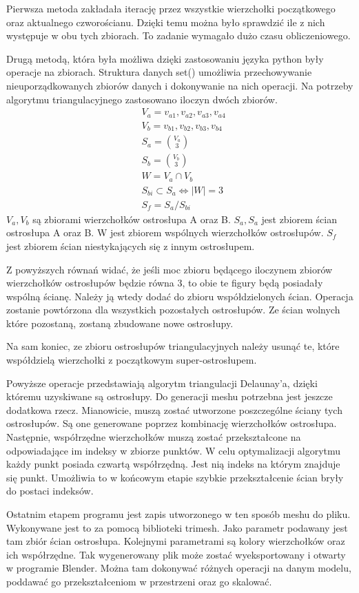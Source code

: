 Pierwsza metoda zakładała iterację przez wszystkie wierzchołki początkowego oraz aktualnego czworościanu. Dzięki temu można było sprawdzić ile z nich występuje w obu tych zbiorach. To zadanie wymagało dużo czasu obliczeniowego.

Drugą metodą, która była możliwa dzięki zastosowaniu języka python były operacje na zbiorach. Struktura danych set() umożliwia przechowywanie nieuporządkowanych zbiorów danych i dokonywanie na nich operacji. Na potrzeby algorytmu triangulacyjnego zastosowano iloczyn dwóch zbiorów.
\begin{equation}
    \begin{aligned}
    &V_{a}={v_{a1},v_{a2},v_{a3},v_{a4}}\\
    &V_{b}={v_{b1},v_{b2},v_{b3},v_{b4}}\\
    &S_{a}=\binom{V_{a}}{3}\\
    &S_{b}=\binom{V_{b}}{3}\\
    &W=V_{a} \cap V_{b}\\
    &S_{bi} 	\subset S_{a} \Leftrightarrow |W|=3\\
    &S_{f}=S_{a}/S_{bi}
    \end{aligned}
\end{equation}
$V_{a},V_{b}$ są zbiorami wierzchołków ostrosłupa A oraz B. $S_{a},S_{a}$ jest zbiorem ścian ostrosłupa A oraz B. W jest zbiorem wspólnych wierzchołków ostrosłupów. $S_{f}$ jest zbiorem ścian niestykających się z innym ostrosłupem.

Z powyższych równań widać, że jeśli moc zbioru będącego iloczynem zbiorów wierzchołków ostrosłupów będzie równa 3, to obie te figury będą posiadały wspólną ścianę. Należy ją wtedy dodać do zbioru współdzielonych ścian. Operacja zostanie powtórzona dla wszystkich pozostałych ostrosłupów. Ze ścian wolnych które pozostaną, zostaną zbudowane nowe ostrosłupy.

Na sam koniec, ze zbioru ostrosłupów triangulacyjnych należy usunąć te, które współdzielą wierzchołki z początkowym super-ostrosłupem.

Powyższe operacje przedstawiają algorytm triangulacji Delaunay'a, dzięki któremu uzyskiwane są ostrosłupy. Do generacji meshu potrzebna jest jeszcze dodatkowa rzecz. Mianowicie, muszą zostać utworzone poszczególne ściany tych ostrosłupów. Są one generowane poprzez kombinację wierzchołków ostrosłupa. Następnie, współrzędne wierzchołków muszą zostać przekształcone na odpowiadające im indeksy w zbiorze punktów. W celu optymalizacji algorytmu każdy punkt posiada czwartą współrzędną. Jest nią indeks na którym znajduje się punkt. Umożliwia to w końcowym etapie szybkie przekształcenie ścian bryły do postaci indeksów.

Ostatnim etapem programu jest zapis utworzonego w ten sposób meshu do pliku. Wykonywane jest to za pomocą biblioteki trimesh. Jako parametr podawany jest tam zbiór ścian ostrosłupa. Kolejnymi parametrami są kolory wierzchołków oraz ich współrzędne. Tak wygenerowany plik może zostać wyeksportowany i otwarty w programie Blender. Można tam dokonywać różnych operacji na danym modelu, poddawać go przekształceniom w przestrzeni oraz go skalować.
